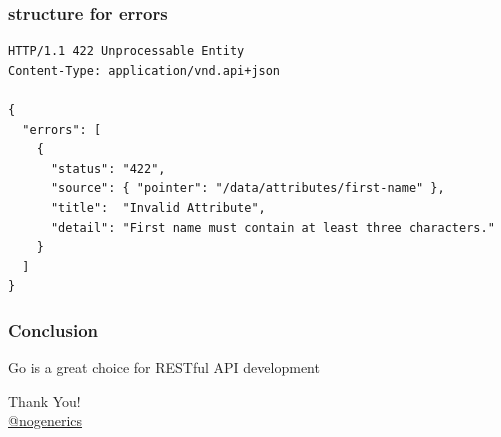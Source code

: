 \documentclass[aspectratio=169]{beamer}
\begin{document}
\begin{frame}[fragile]
  \frametitle{structure for errors}

  \begin{Verbatim}[fontsize=\tiny]
HTTP/1.1 422 Unprocessable Entity
Content-Type: application/vnd.api+json

{
  "errors": [
    {
      "status": "422",
      "source": { "pointer": "/data/attributes/first-name" },
      "title":  "Invalid Attribute",
      "detail": "First name must contain at least three characters."
    }
  ]
}
  \end{Verbatim}

\end{frame}

\begin{frame}
  \frametitle{Conclusion}

  Go is a great choice for RESTful API development\!

\end{frame}

\begin{frame}
  \begin{center}
    {\huge Thank You!}\\[1cm]
    {\large \href{https://twitter.com/nogenerics}{@nogenerics}}
  \end{center}
\end{frame}
\end{document}
